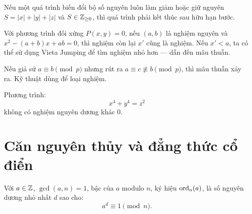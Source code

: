 \documentclass[../imo-training-open-book.tex]{subfiles}
\begin{document}
\begin{theorem*}[\href{https://w.wiki/9Wcv}{Monovariant \( S = |x| + |y| + |z| \)}]
    \label{theorem:monovariant-absolute-sum}
    Nếu một quá trình biến đổi bộ số nguyên luôn làm giảm hoặc giữ nguyên \( S = |x| + |y| + |z| \) và \( S \in \mathbb Z_{\ge 0} \), thì quá trình phải kết thúc sau hữu hạn bước.
\end{theorem*}

\vspace{1em}

\begin{theorem*}
    \label{theorem:vieta-jumping}
    Với phương trình đối xứng \( P(x, y) = 0 \), nếu \( (a, b) \) là nghiệm nguyên và \( x^2 - (a + b)x + ab = 0 \), thì nghiệm còn lại \( x' \) cũng là nghiệm. Nếu \( x' < a \), ta có thể sử dụng Vieta Jumping để tìm nghiệm nhỏ hơn — dẫn đến mâu thuẫn.
\end{theorem*}

\vspace{1em}

\begin{lemma*}
    \label{lemma:modular-contradiction}
    Nếu giả sử \( a \equiv b \pmod{p} \) nhưng rút ra \( a \equiv c \not\equiv b \pmod{p} \), thì mâu thuẫn xảy ra. Kỹ thuật dùng để loại nghiệm.
\end{lemma*}

\vspace{1em}

\begin{theorem*}
    \label{theorem:fermat-christmas}
    Phương trình:
    \[
        x^4 + y^4 = z^2
    \]
    không có nghiệm nguyên dương khác 0.
\end{theorem*}

\newpage

\section{Căn nguyên thủy và đẳng thức cổ điển}

\begin{definition*}
    \label{definition:order-modulo-n}
    Với \( a \in \mathbb Z \), \( \gcd(a, n) = 1 \), bậc của \( a \) modulo \( n \), ký hiệu \( \operatorname{ord}_n(a) \), là số nguyên dương nhỏ nhất \( d \) sao cho:
    \[
        a^d \equiv 1 \pmod{n}.
    \]
\end{definition*}
\end{document}

